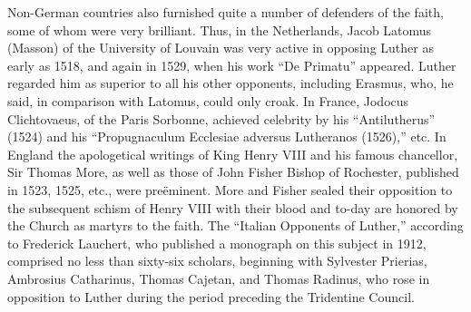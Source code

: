 Non-German countries also furnished quite a number of defenders
of the faith, some of whom were very brilliant. Thus, in the Netherlands,
Jacob Latomus (Masson) of the University of Louvain was
very active in opposing Luther as early as 1518, and again in 1529,
when his work “De Primatu” appeared. Luther regarded him as
superior to all his other opponents, including Erasmus, who, he
said, in comparison with Latomus, could only croak. In France, Jodocus
Clichtovaeus, of the Paris Sorbonne, achieved celebrity by his
“Antilutherus” (1524) and his “Propugnaculum Ecclesiae adversus
Lutheranos (1526),” etc. In England the apologetical writings of
King Henry VIII and his famous chancellor, Sir Thomas More, as well
as those of John Fisher Bishop of Rochester, published in 1523, 1525,
etc., were preëminent. More and Fisher sealed their opposition to the
subsequent schism of Henry VIII with their blood and to-day are
honored by the Church as martyrs to the faith. The “Italian Opponents of
Luther,” according to Frederick Lauchert, who published a
monograph on this subject in 1912, comprised no less than sixty-six
scholars, beginning with Sylvester Prierias, Ambrosius Catharinus,
Thomas Cajetan, and Thomas Radinus, who rose in opposition to
Luther during the period preceding the Tridentine Council.
